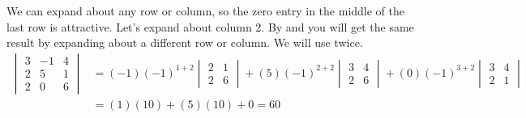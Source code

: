 We can expand about any row or column, so the zero entry in the middle of the last row is attractive.  Let's expand about column 2.  By  and  you will get the same result by expanding about a different row or column.  We will use  twice.
%
\begin{align*}
\begin{vmatrix}
3 & -1 & 4\\
2 & 5 & 1\\
2 & 0 & 6
\end{vmatrix}
&=
(-1)(-1)^{1+2}
\begin{vmatrix}
2 &  1\\
2 &  6
\end{vmatrix}
+
(5)(-1)^{2+2}
\begin{vmatrix}
3 &  4\\
2 &  6
\end{vmatrix}
+
(0)(-1)^{3+2}
\begin{vmatrix}
3 &  4\\
2 &  1
\end{vmatrix}\\
%
&=(1)(10)+(5)(10)+0=60
%
\end{align*}
